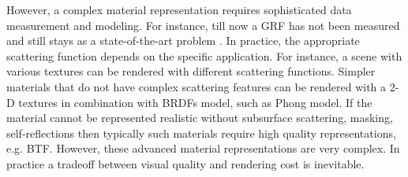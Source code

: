 However, a complex material representation requires sophisticated data measurement and modeling.
For instance, till now a GRF has not been measured and still stays as a state-of-the-art problem \cite{haindl_visual}.
In practice, the appropriate scattering function depends on the specific application.
For instance, a scene with various textures can be rendered with different scattering functions. 
Simpler materials that do not have complex scattering features can be rendered with a 2-D textures in combination with BRDFs model, such as Phong model.
If the material cannot be represented realistic without subsurface scattering, masking, self-reflections then typically such materials require high quality representations, e.g. BTF.
However, these advanced material representations are very complex.
In practice a tradeoff between visual quality and rendering cost is inevitable. 




